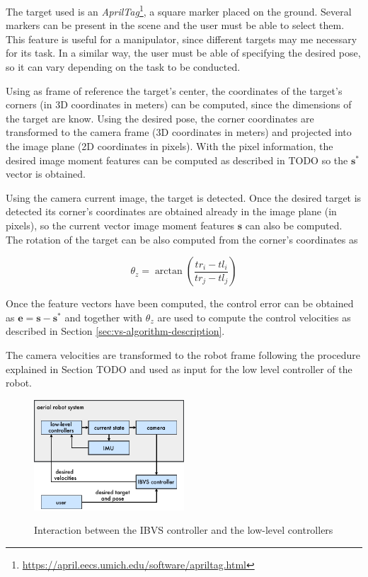 The target used is an \emph{AprilTag}\footnote{\url{https://april.eecs.umich.edu/software/apriltag.html}}, a square marker placed on the ground. Several markers can be present in the scene and the user must be able to select them. This feature is useful for a manipulator, since different targets may me necessary for its task. In a similar way, the user must be able of specifying the desired pose, so it can vary depending on the task to be conducted.

Using as frame of reference the target's center, the coordinates of the target's corners (in 3D coordinates in meters) can be computed, since the dimensions of the target are know. Using the desired pose, the corner coordinates are transformed to the camera frame (3D coordinates in meters) and projected into the image plane (2D coordinates in pixels). With the pixel information, the desired image moment features can be computed as described in TODO so the $\bm{s}^\ast$ vector is obtained.
 
Using the camera current image, the target is detected. Once the desired target is detected its corner's coordinates are obtained already in the image plane (in pixels), so the current vector image moment features $\bm{s}$ can also be computed. The rotation of the target can be also computed from the corner's coordinates as

\begin{equation}
 \theta_z = \arctan \left( \frac{tr_i - tl_i}{tr_j - tl_j} \right) 
\end{equation}
 
 Once the feature vectors have been computed, the control error can be obtained as $\bm{e} = \bm{s} - \bm{s}^\ast$ and together with $\theta_z$ are used to compute the control velocities as described in Section \ref{sec:vs-algorithm-description}.
 
 The camera velocities are transformed to the robot frame following the procedure explained in Section TODO and used as input for the low level controller of the robot. 
	
\begin{figure}[!htb]
		\caption{Interaction between the IBVS controller and the low-level controllers}
	\centering
	\includegraphics[width=0.5\textwidth]{content/chapter_04/images/context_diagram.pdf}
	\label{fig:low-level-ibvs}
\end{figure}



